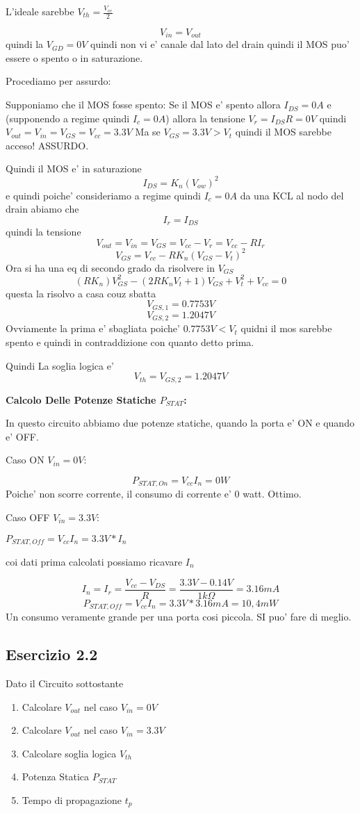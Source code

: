 \documentclass[\main/main.tex]{subfiles}
\begin{document}
L'ideale sarebbe $V_{th} = \frac{V_{cc}}{2}$

\[V_{in} = V_{out}\]
quindi la $V_{GD} = 0V$ quindi non vi e' canale dal lato del drain quindi il MOS puo' essere o spento o in saturazione.

Procediamo per assurdo:

Supponiamo che il MOS fosse spento:
Se il MOS e' spento allora $I_{DS} = 0A$ e (supponendo a regime quindi $I_c = 0A$) allora la tensione $V_r = I_{DS} R = 0V$ quindi $V_{out} = V_{in} = V_{GS} = V_{cc} = 3.3V$
Ma se $V_{GS} = 3.3V > V_t$ quindi il MOS sarebbe acceso!
ASSURDO.

Quindi il MOS e' in saturazione
\[I_{DS} = K_n \left(V_{ow}\right)^2 \]
e quindi poiche' consideriamo a regime quindi $I_c = 0A$
da una KCL al nodo del drain abiamo che
\[I_r = I_{DS} \]
quindi la tensione
\[V_{out} = V_{in} = V_{GS} = V_{cc} - V_r = V_{cc} - R I_r\]
\[V_{GS} = V_{cc} - R K_n \left(V_{GS} - V_t \right)^2\]
Ora si ha una eq di secondo grado da risolvere in $V_{GS}$
\[(R K_n)V_{GS}^2 - (2 R K_n V_t + 1)V_{GS} + V_t^2 + V_{cc} = 0\]
questa la risolvo a casa couz sbatta
\[V_{GS,1} = 0.7753V\]
\[V_{GS,2} = 1.2047V\]
Ovviamente la prima e' sbagliata poiche' $0.7753V < V_t$ quidni il mos sarebbe spento e quindi in contraddizione con quanto detto prima.

Quindi La soglia logica e' \[V_{th} = V_{GS,2} = 1.2047V\]

\textbf{Calcolo Delle Potenze Statiche $P_{STAT}$:}

In questo circuito abbiamo due potenze statiche, quando la porta e' ON e quando e' OFF.

Caso ON $V_{in} = 0V$:

\[P_{STAT,On} = V_{cc} I_{n} = 0W\]
Poiche' non scorre corrente, il consumo di corrente e' 0 watt. Ottimo.


Caso OFF $V_{in} = 3.3V$:

$P_{STAT,Off} = V_{cc} I_{n} = 3.3V * I_{n}$

coi dati prima calcolati possiamo ricavare $I_{n}$

\[I_{n} = I_{r} = \frac{V_{cc} - V_{DS}}{R} = \frac{3.3V - 0.14V}{1k\Omega} = 3.16mA\]
\[P_{STAT,Off} = V_{cc} I_{n} = 3.3V * 3.16mA = 10,4mW\]
Un consumo veramente grande per una porta cosi piccola. SI puo' fare di meglio.

\clearpage
\subsection{Esercizio 2.2}
Dato il Circuito sottostante
\begin{enumerate}
\item  Calcolare $V_{out}$ nel caso $V_{in} = 0V$
\item  Calcolare $V_{out}$ nel caso $V_{in} = 3.3V$
\item  Calcolare soglia logica $V_{th}$
\item  Potenza Statica $P_{STAT}$
\item  Tempo di propagazione $t_p$
\end{enumerate}
\end{document}
